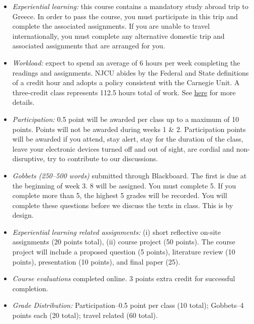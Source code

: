 \documentclass[article,oneside]{memoir}
\begin{document}
\begin{itemize}

\item \textit{Experiential learning:} this course contains a mandatory study abroad trip to Greece. In order to pass the course, you must participate in this trip and complete the associated assignments. If you are unable to travel internationally, you must complete any alternative domestic trip and associated assignments that are arranged for you.   

\item \textit{Workload:} expect to spend an average of 6 hours per week completing the readings and assignments. NJCU abides by the Federal and State definitions of a credit hour and adopts a policy consistent with the Carnegie Unit. A three-credit class represents 112.5 hours total of work. See \href{http://scottoconnor.org/resources/Credit.pdf}{here} for more details.

\item \textit{Participation:} 0.5 point will be awarded per class up to a maximum of 10 points. Points will not be awarded during weeks 1 \& 2. Participation points will be awarded if you attend, stay alert, stay for the duration of the class, leave your electronic devices turned off and out of sight, are cordial and non-disruptive, try to contribute to our discussions. 


\item \textit{Gobbets (250--500 words)} submitted through Blackboard. The first is due at the beginning of week 3. 8 will be assigned. You must complete 5. If you complete more than 5, the highest 5 grades will be recorded. You will complete these questions before we discuss the texts in class. This is by design. 

\item \textit{Experiential learning related assignments:} (i) short reflective on-site assignments (20 points total), (ii) course project (50 points). The course project will include a proposed question (5 points), literature review (10 points), presentation (10 points), and final paper (25). 

\item \textit{Course evaluations} completed online. 3 points extra credit for successful completion.





\item \textit{Grade Distribution:} Participation--0.5 point per class (10 total); Gobbets--4 points each (20 total); travel related  (60 total).


\end{itemize}
\end{document}
